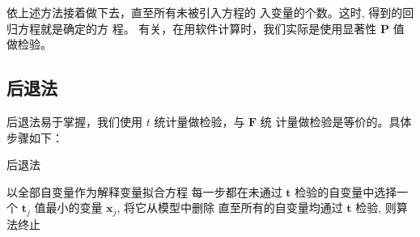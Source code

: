 依上述方法接着做下去，直至所有未被引入方程的
入变量的个数。这时, 得到的回归方程就是确定的方
程。
有关，在用软件计算时，我们实际是使用显著性 \( \boldsymbol{P} \) 值
做检验。

\subsection{后退法}

后退法易于掌握，我们使用 \( t \) 统计量做检验，与 \( \boldsymbol{F} \) 统
计量做检验是等价的。具体步骤如下：

\begin{algorithm}
    \caption{后退法}
    以全部自变量作为解释变量拟合方程\;
    每一步都在未通过 \( \boldsymbol{t} \) 检验的自变量中选择一个
\( \boldsymbol{t}_{j} \) 值最小的变量 \( \boldsymbol{x}_{j} \), 将它从模型中删除\;
    直至所有的自变量均通过 \( \boldsymbol{t} \) 检验, 则算法终止\;
\end{algorithm}
